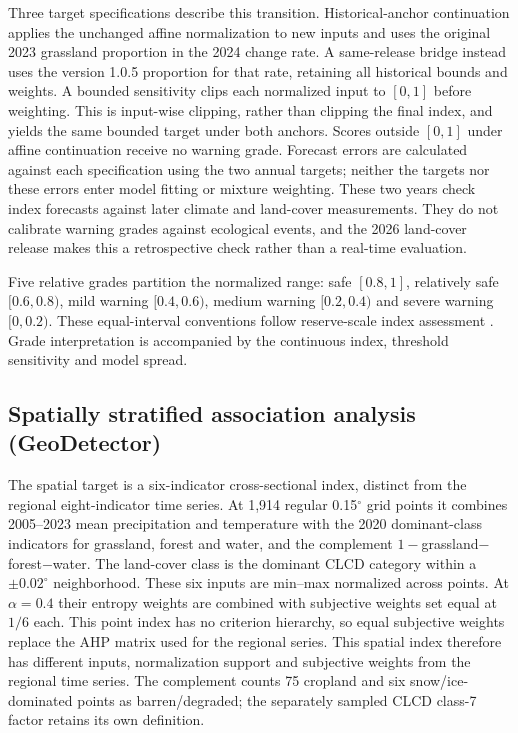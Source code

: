 \documentclass[preprint,11pt,authoryear]{elsarticle}
\begin{document}
Three target specifications describe this transition. Historical-anchor continuation applies the unchanged affine normalization to new inputs and uses the original 2023 grassland proportion in the 2024 change rate. A same-release bridge instead uses the version 1.0.5 proportion for that rate, retaining all historical bounds and weights. A bounded sensitivity clips each normalized input to $[0,1]$ before weighting. This is input-wise clipping, rather than clipping the final index, and yields the same bounded target under both anchors. Scores outside $[0,1]$ under affine continuation receive no warning grade. Forecast errors are calculated against each specification using the two annual targets; neither the targets nor these errors enter model fitting or mixture weighting. These two years check index forecasts against later climate and land-cover measurements. They do not calibrate warning grades against ecological events, and the 2026 land-cover release makes this a retrospective check rather than a real-time evaluation.

Five relative grades partition the normalized range: safe $[0.8,1]$, relatively safe $[0.6,0.8)$, mild warning $[0.4,0.6)$, medium warning $[0.2,0.4)$ and severe warning $[0,0.2)$. These equal-interval conventions follow reserve-scale index assessment \citep{liu2023integrated}. Grade interpretation is accompanied by the continuous index, threshold sensitivity and model spread.

\subsection{Spatially stratified association analysis (GeoDetector)}
The spatial target is a six-indicator cross-sectional index, distinct from the regional eight-indicator time series. At 1,914 regular 0.15$^{\circ}$ grid points it combines 2005--2023 mean precipitation and temperature with the 2020 dominant-class indicators for grassland, forest and water, and the complement $1-$grassland$-$forest$-$water. The land-cover class is the dominant CLCD category within a $\pm0.02^{\circ}$ neighborhood. These six inputs are min--max normalized across points. At $\alpha=0.4$ their entropy weights are combined with subjective weights set equal at $1/6$ each. This point index has no criterion hierarchy, so equal subjective weights replace the AHP matrix used for the regional series. This spatial index therefore has different inputs, normalization support and subjective weights from the regional time series. The complement counts 75 cropland and six snow/ice-dominated points as barren/degraded; the separately sampled CLCD class-7 factor retains its own definition.
\end{document}
